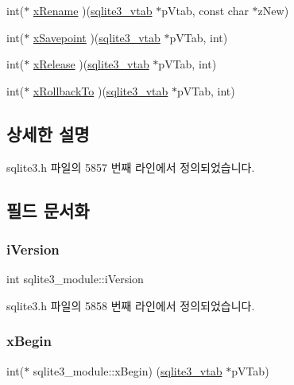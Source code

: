 \begin{DoxyCompactItemize}
\item 
int($\ast$ \hyperlink{structsqlite3__module_a684849a921202d5dec6012824c1d2308}{x\+Rename} )(\hyperlink{structsqlite3__vtab}{sqlite3\+\_\+vtab} $\ast$p\+Vtab, const char $\ast$z\+New)
\item 
int($\ast$ \hyperlink{structsqlite3__module_a3819f1935503e558637647c359193ef9}{x\+Savepoint} )(\hyperlink{structsqlite3__vtab}{sqlite3\+\_\+vtab} $\ast$p\+V\+Tab, int)
\item 
int($\ast$ \hyperlink{structsqlite3__module_ac5f0d86a3e9a26668dbf1251a7c51517}{x\+Release} )(\hyperlink{structsqlite3__vtab}{sqlite3\+\_\+vtab} $\ast$p\+V\+Tab, int)
\item 
int($\ast$ \hyperlink{structsqlite3__module_aaf96452ff3240596b8b8850c2baff3eb}{x\+Rollback\+To} )(\hyperlink{structsqlite3__vtab}{sqlite3\+\_\+vtab} $\ast$p\+V\+Tab, int)
\end{DoxyCompactItemize}


\subsection{상세한 설명}


sqlite3.\+h 파일의 5857 번째 라인에서 정의되었습니다.



\subsection{필드 문서화}
\mbox{\label{structsqlite3__module_a42b11d080dc205aea43581b18f925afe}} 
\subsubsection{\texorpdfstring{i\+Version}{iVersion}}
{\footnotesize\ttfamily int sqlite3\+\_\+module\+::i\+Version}



sqlite3.\+h 파일의 5858 번째 라인에서 정의되었습니다.

\mbox{\label{structsqlite3__module_af190bd5cbd1e3ff30a09ca7b015af1a1}} 
\subsubsection{\texorpdfstring{x\+Begin}{xBegin}}
{\footnotesize\ttfamily int($\ast$ sqlite3\+\_\+module\+::x\+Begin) (\hyperlink{structsqlite3__vtab}{sqlite3\+\_\+vtab} $\ast$p\+V\+Tab)}




